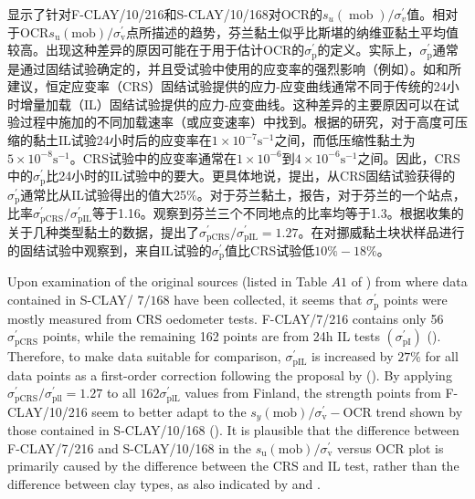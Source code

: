 \begin{ParaColumn}
    显示了针对F-CLAY/10/216和S-CLAY/10/168对OCR的$s_{u}(\operatorname{mob})/\sigma_{v}^{\prime}$值。相对于OCR$s_{\mathrm{u}}(\mathrm{mob})/\sigma_{\mathrm{v}}^{\prime}$点所描述的趋势，芬兰黏土似乎比斯堪的纳维亚黏土平均值较高。出现这种差异的原因可能在于用于估计OCR的$\sigma_{\mathrm{p}}^{\prime}$的定义。实际上，$\sigma_{\mathrm{p}}^{\prime}$通常是通过固结试验确定的，并且受试验中使用的应变率的强烈影响（例如\citet{Leroueil1983477,Leroueil1985159}）。如\citet{Leroueil1985159}和\citet{Leroueil198885,Leroueil1996534}所建议，恒定应变率（CRS）固结试验提供的应力-应变曲线通常不同于传统的24小时增量加载（IL）固结试验提供的应力-应变曲线。这种差异的主要原因可以在试验过程中施加的不同加载速率（或应变速率）中找到。根据\citet{Leroueil1996534}的研究，对于高度可压缩的黏土IL试验24小时后的应变率在$1\times 10^{-7}\mathrm{s}^{-1}$之间，而低压缩性黏土为$5\times 10^{-8}\mathrm{s}^{-1}$。CRS试验中的应变率通常在$1\times 10^{-6}$到$4\times 10^{-6}\mathrm{s}^{-1}$之间。因此，CRS中的$\sigma_{\mathrm{p}}^{\prime}$比24小时的IL试验中的要大\citep{Leroueil1996534}。更具体地说，\citet{Leroueil1996534}提出，从CRS固结试验获得的$\sigma_{\mathrm{p}}^{\prime}$通常比从IL试验得出的值大25$\%$。对于芬兰黏土，\citet{Kolisoja198961}报告，对于芬兰的一个站点，比率$\sigma_{\mathrm{pCRS}}^{\prime}/\sigma_{\mathrm{pIL}}^{\prime}$等于1.16。\citet{Hoikkala1991}观察到芬兰三个不同地点的比率均等于1.3。\citet{Länsivaara1999}根据\citet{Leroueil1996534}收集的关于几种类型黏土的数据，提出了$\sigma_{\text{pCRS}}^{\prime}/\sigma_{\mathrm{pIL}}^{\prime}=1.27$。\citet{Karlsrud20131273}在对挪威黏土块状样品进行的固结试验中观察到，来自IL试验的$\sigma_{\mathrm{p}}^{\prime}$值比CRS试验低$10\%-18\%$。

    \switchcolumn*

    Upon examination of the original sources (listed in Table $A1$ of \citet{Ching2014663}) from where data contained in S-CLAY/ $7 / 168$ have been collected, it seems that $\sigma_{\mathrm{p}}^{\prime}$ points were mostly measured from CRS oedometer tests. F-CLAY/7/216 contains only 56 $\sigma_{\mathrm{pCRS}}^{\prime}$ points, while the remaining 162 points are from 24h $\mathrm{IL}$ tests $\left(\sigma_{\mathrm{pI}}^{\prime}\right)$ (). Therefore, to make data suitable for comparison, $\sigma_{\mathrm{pIL}}^{\prime}$ is increased by $27\%$ for all data points as a first-order correction following the proposal by \citet{Länsivaara1999} (). By applying $\sigma_{\mathrm{pCRS}}^{\prime} / \sigma_{\mathrm{pll}}^{\prime}=1.27$ to all $162 \sigma_{\mathrm{plL}}^{\prime}$ values from Finland, the strength points from F-CLAY/10/216 seem to better adapt to the $s_{y}(\mathrm{mob}) / \sigma_{\mathrm{v}}^{\prime}-\mathrm{OCR}$ trend shown by those contained in S-CLAY/10/168 (). It is plausible that the difference between F-CLAY/7/216 and S-CLAY/10/168 in the $s_{\mathrm{u}}(\mathrm{mob}) / \sigma_{\mathrm{v}}^{\prime}$ versus $\mathrm{OCR}$ plot is primarily caused by the difference between the CRS and IL test, rather than the difference between clay types, as also indicated by  and .


\end{ParaColumn}
